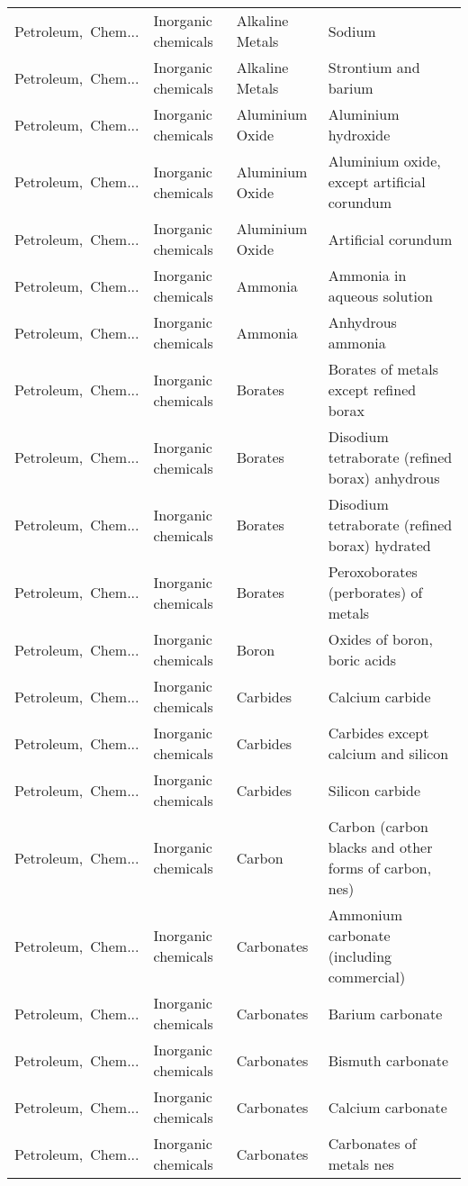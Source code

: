 \begin{appendices}
\begin{xltabular}{\textwidth}{|p{0.10\textwidth}|p{0.25\textwidth}|p{0.24\textwidth}|p{0.31\textwidth}|}
Petroleum,\ Chem... & Inorganic chemicals & Alkaline Metals & Sodium \\
Petroleum,\ Chem... & Inorganic chemicals & Alkaline Metals & Strontium and barium \\
Petroleum,\ Chem... & Inorganic chemicals & Aluminium Oxide & Aluminium hydroxide \\
Petroleum,\ Chem... & Inorganic chemicals & Aluminium Oxide & Aluminium oxide, except artificial corundum \\
Petroleum,\ Chem... & Inorganic chemicals & Aluminium Oxide & Artificial corundum \\
Petroleum,\ Chem... & Inorganic chemicals & Ammonia & Ammonia in aqueous solution \\
Petroleum,\ Chem... & Inorganic chemicals & Ammonia & Anhydrous ammonia \\
Petroleum,\ Chem... & Inorganic chemicals & Borates & Borates of metals except refined borax \\
Petroleum,\ Chem... & Inorganic chemicals & Borates & Disodium tetraborate (refined borax) anhydrous \\
Petroleum,\ Chem... & Inorganic chemicals & Borates & Disodium tetraborate (refined borax) hydrated \\
Petroleum,\ Chem... & Inorganic chemicals & Borates & Peroxoborates (perborates) of metals \\
Petroleum,\ Chem... & Inorganic chemicals & Boron & Oxides of boron, boric acids \\
Petroleum,\ Chem... & Inorganic chemicals & Carbides & Calcium carbide \\
Petroleum,\ Chem... & Inorganic chemicals & Carbides & Carbides except calcium and silicon \\
Petroleum,\ Chem... & Inorganic chemicals & Carbides & Silicon carbide \\
Petroleum,\ Chem... & Inorganic chemicals & Carbon & Carbon (carbon blacks and other forms of carbon, nes) \\
Petroleum,\ Chem... & Inorganic chemicals & Carbonates & Ammonium carbonate (including commercial) \\
Petroleum,\ Chem... & Inorganic chemicals & Carbonates & Barium carbonate \\
Petroleum,\ Chem... & Inorganic chemicals & Carbonates & Bismuth carbonate \\
Petroleum,\ Chem... & Inorganic chemicals & Carbonates & Calcium carbonate \\
Petroleum,\ Chem... & Inorganic chemicals & Carbonates & Carbonates of metals nes \\

\end{xltabular}
\end{appendices}
